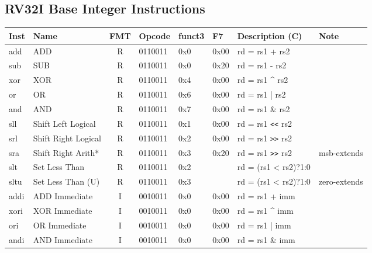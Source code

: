 \subsection*{RV32I Base Integer Instructions}

\begin{tabular}
{T | l | c | T | T | T | T | l} \hline
\rm Inst & Name                    & FMT & \rm Opcode & \rm funct3 & \rm F7 & \rm Description (C)          & Note \\ \hline
add      & ADD                     & R   & 0110011    & 0x0    & 0x00   & rd = rs1 + rs2               & \\
sub      & SUB                     & R   & 0110011    & 0x0    & 0x20   & rd = rs1 - rs2               & \\
xor      & XOR                     & R   & 0110011    & 0x4    & 0x00   & rd = rs1 \^{} rs2            & \\
or       & OR                      & R   & 0110011    & 0x6    & 0x00   & rd = rs1 | rs2               & \\
and      & AND                     & R   & 0110011    & 0x7    & 0x00   & rd = rs1 \& rs2              & \\
sll      & Shift Left Logical      & R   & 0110011    & 0x1    & 0x00   & rd = rs1 \verb|<<| rs2       & \\
srl      & Shift Right Logical     & R   & 0110011    & 0x2    & 0x00   & rd = rs1 \verb|>>| rs2       & \\
sra      & Shift Right Arith*      & R   & 0110011    & 0x3    & 0x20   & rd = rs1 \verb|>>| rs2       & msb-extends \\
slt      & Set Less Than           & R   & 0110011    & 0x2    &        & rd = (rs1 < rs2)?1:0         & \\
sltu     & Set Less Than (U)       & R   & 0110011    & 0x3    &        & rd = (rs1 < rs2)?1:0         & zero-extends \\ \hline
addi     & ADD Immediate           & I   & 0010011    & 0x0    & 0x00   & rd = rs1 + imm               & \\
xori     & XOR Immediate           & I   & 0010011    & 0x0    & 0x00   & rd = rs1 \^{} imm            & \\
ori      & OR Immediate            & I   & 0010011    & 0x0    & 0x00   & rd = rs1 | imm               & \\
andi     & AND Immediate           & I   & 0010011    & 0x0    & 0x00   & rd = rs1 \& imm              & \\

\end{tabular}
